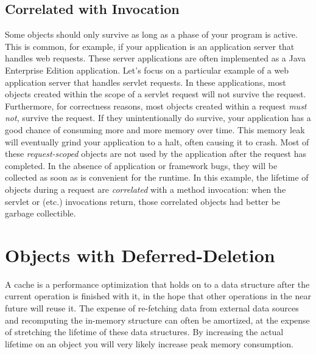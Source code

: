 \subsection{Correlated with Invocation}
\label{correlated-lifetime-2}

Some objects should only survive as long as a phase of your program is active.
This is common, for example, if your application is an application server that
handles web requests. These server applications are often implemented as a Java
Enterprise Edition application. Let's focus on a particular example of a web
application server that handles servlet requests. In these applications, most
objects created within the scope of a servlet request will not survive the
request. Furthermore, for correctness reasons, most objects created within a
request {\em must not}, survive the request. If they unintentionally do survive,
your application has a good chance of consuming more and more memory over time.
 This memory leak will eventually grind your application to a
halt, often causing it to crash. Most of these {\em request-scoped}
 objects are not used by the application after the
request has completed. In the absence of application or framework bugs, they will
be collected as soon as is convenient for the runtime. In this example, the
lifetime of objects during a request are {\em correlated} with a method
invocation: when the servlet  or  (etc.) invocations
return, those correlated objects had better be garbage collectible.


\section{Objects with Deferred-Deletion}
\label{deferred-deletion}

A cache is a performance optimization that holds on to a data structure after the
current operation is finished with it, in the hope that other operations in the
near future will reuse it. The expense of re-fetching data from external data
sources and recomputing the in-memory structure can often be amortized, at the
expense of stretching the lifetime of these data structures. By increasing the
actual lifetime on an object you will very likely increase peak memory
consumption.



